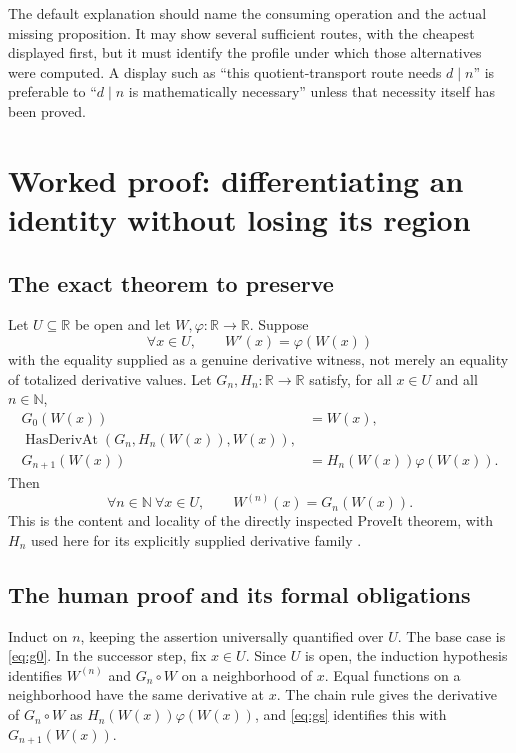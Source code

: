 \documentclass[11pt,a4paper]{article}
\newcommand{\N}{\mathbb N}\newcommand{\Z}{\mathbb Z}\newcommand{\Q}{\mathbb Q}\newcommand{\R}{\mathbb R}
\theoremstyle{plain}
\theoremstyle{definition}
\theoremstyle{remark}
\begin{document}
The default explanation should name the consuming operation and the actual missing proposition. It may show several sufficient routes, with the cheapest displayed first, but it must identify the profile under which those alternatives were computed. A display such as ``this quotient-transport route needs $d\mid n$'' is preferable to ``$d\mid n$ is mathematically necessary'' unless that necessity itself has been proved.

\section{Worked proof: differentiating an identity without losing its region}\label{sec:ode}

\subsection{The exact theorem to preserve}
Let $U\subseteq\R$ be open and let $W,\varphi:\R\to\R$. Suppose
\[
 \forall x\in U,\qquad W'(x)=\varphi(W(x))
\]
with the equality supplied as a genuine derivative witness, not merely an equality of totalized derivative values. Let $G_n,H_n:\R\to\R$ satisfy, for all $x\in U$ and all $n\in\N$,
\begin{align}
 G_0(W(x))&=W(x),\label{eq:g0}\\
 \operatorname{HasDerivAt}(G_n,H_n(W(x)),W(x)),&\label{eq:gd}\\
 G_{n+1}(W(x))&=H_n(W(x))\varphi(W(x)).\label{eq:gs}
\end{align}
Then
\begin{equation}\label{eq:ode-result}
 \forall n\in\N\ \forall x\in U,\qquad W^{(n)}(x)=G_n(W(x)).
\end{equation}
This is the content and locality of the directly inspected ProveIt theorem, with $H_n$ used here for its explicitly supplied derivative family \cite{autonomous}.

\subsection{The human proof and its formal obligations}
Induct on $n$, keeping the assertion universally quantified over $U$. The base case is \eqref{eq:g0}. In the successor step, fix $x\in U$. Since $U$ is open, the induction hypothesis identifies $W^{(n)}$ and $G_n\circ W$ on a neighborhood of $x$. Equal functions on a neighborhood have the same derivative at $x$. The chain rule gives the derivative of $G_n\circ W$ as $H_n(W(x))\varphi(W(x))$, and \eqref{eq:gs} identifies this with $G_{n+1}(W(x))$.
\end{document}
